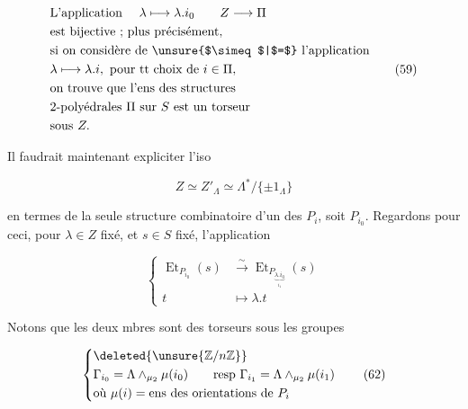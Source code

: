 
\[
\begin{aligned}
 &\text{L'application }\quad\lambda\longmapsto\lambda.i_0\qquad Z\longrightarrow\Pi\\
 &\text{est bijective ; plus précisément,}\\
 &\text{si on considère de \unsure{$\simeq$|$=$} l'application}\\
 &\lambda\longmapsto\lambda.i,\ \text{pour tt choix de }i\in\Pi,\\
 &\text{on trouve que l'ens des structures}\\
 &\text{2-polyédrales }\Pi\text{ sur }S\text{ est un torseur}\\
 &\text{sous }Z.
\end{aligned}\tag*{(59)}
\]

Il faudrait maintenant expliciter l'iso

\[
Z\simeq Z'_\Lambda\simeq\Lambda^*/\{\pm 1_\Lambda\}\tag*{(60)}
\]

en termes de la seule structure combinatoire d'un des $P_i$, soit $P_{i_0}$. Regardons pour ceci, pour $\lambda\in Z$ fixé, et $s\in S$ fixé, l'application

\[
\left\{\begin{aligned}
 \operatorname{Et}_{P_{i_0}}(s)&\overset{\sim}{\longrightarrow}\operatorname{Et}_{P_{\underbrace{\lambda.i_0}_{i_1}}}(s)\\
 t&\longmapsto\lambda.t
\end{aligned}\right.\tag*{(61)}
\]

Notons que les deux mbres sont des torseurs sous les groupes

\[
\left\{\begin{aligned}
 &\deleted{\unsure{\mathbb Z/n\mathbb Z}}\\
 &\Gamma_{i_0}=\Lambda\wedge_{\mu_2}\mu(i_0)\qquad\text{resp }\Gamma_{i_1}=\Lambda\wedge_{\mu_2}\mu(i_1)\\
 &\text{où }\mu(i)=\text{ens des orientations de }P_i
\end{aligned}\right.\tag*{(62)}
\]
